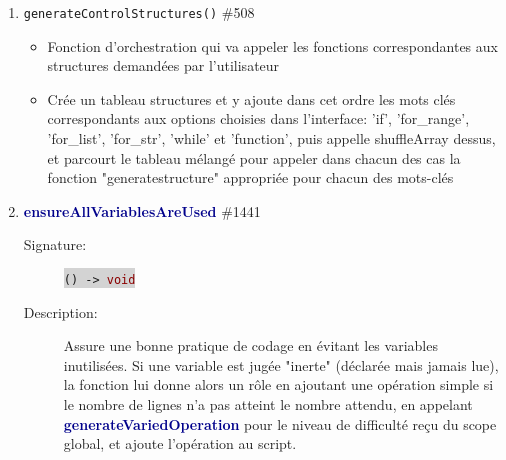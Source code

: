 \documentclass[11pt,a4paper]{article}
\newcommand{\code}[1]{\colorbox{lightgray}{\texttt{\small #1}}}
\newcommand{\methodname}[1]{\textbf{\textcolor{darkblue}{#1}}}
\newcommand{\rettype}[1]{\textcolor{darkred}{#1}}
\begin{document}
\begin{enumerate}
    \item \texttt{generateControlStructures()} \#508
    \begin{itemize}
        \item Fonction d'orchestration qui va appeler les fonctions correspondantes aux structures demandées par l'utilisateur
        \item Crée un tableau structures et y ajoute dans cet ordre les mots clés correspondants aux options choisies dans l'interface: 'if', 'for\_range', 'for\_list', 'for\_str', 'while' et 'function', puis appelle shuffleArray dessus, et parcourt le tableau mélangé pour appeler dans chacun des cas la fonction "generate{structure}" appropriée pour chacun des mots-clés
    \end{itemize}

    \item \methodname{ensureAllVariablesAreUsed} \#1441
    \begin{description}
    \item[Signature:] \code{() -> \rettype{void}}
    \item[Description:] Assure une bonne pratique de codage en évitant les variables inutilisées. Si une variable est jugée "inerte" (déclarée mais jamais lue), la fonction lui donne alors un rôle en ajoutant une opération simple si le nombre de lignes n'a pas atteint le nombre attendu, en appelant \methodname{generateVariedOperation} pour le niveau de difficulté reçu du scope global, et ajoute l'opération au script.
    \end{description}


\end{enumerate}
\end{document}
